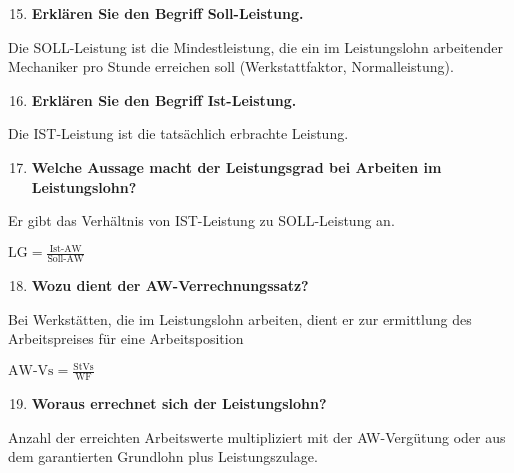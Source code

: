 \begin{enumerate}
\setcounter{enumi}{14}
\item
  \textbf{Erklären Sie den Begriff Soll-Leistung.}
\end{enumerate}

Die SOLL-Leistung ist die Mindestleistung, die ein im Leistungslohn
arbeitender Mechaniker pro Stunde erreichen soll (Werkstattfaktor,
Normalleistung).

\begin{enumerate}
\setcounter{enumi}{15}
\item
  \textbf{Erklären Sie den Begriff Ist-Leistung.}
\end{enumerate}

Die IST-Leistung ist die tatsächlich erbrachte Leistung.

\begin{enumerate}
\setcounter{enumi}{16}
\item
  \textbf{Welche Aussage macht der Leistungsgrad bei Arbeiten im
  Leistungslohn?}
\end{enumerate}

Er gibt das Verhältnis von IST-Leistung zu SOLL-Leistung an.

$\boxed{\text{LG} = \frac{\text{Ist-AW}}{\text{Soll-AW}}}$

\begin{enumerate}
\setcounter{enumi}{17}
\item
  \textbf{Wozu dient der AW-Verrechnungssatz?}
\end{enumerate}

Bei Werkstätten, die im Leistungslohn arbeiten, dient er zur ermittlung
des Arbeitspreises für eine Arbeitsposition

$\boxed{\text{AW-Vs} = \frac{\text{StVs}}{\text{WF}}}$

\begin{enumerate}
\setcounter{enumi}{18}
\item
  \textbf{Woraus errechnet sich der Leistungslohn?}
\end{enumerate}

Anzahl der erreichten Arbeitswerte multipliziert mit der AW-Vergütung
oder aus dem garantierten Grundlohn plus Leistungszulage.
